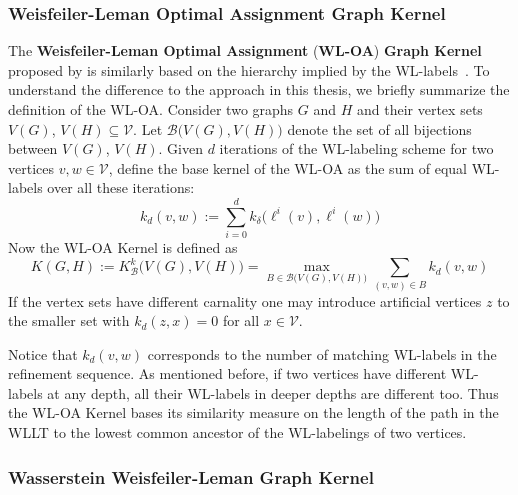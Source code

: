 	\subsubsection{Weisfeiler-Leman Optimal Assignment Graph Kernel} \label{subsec:def_WLOA}
		The \textbf{Weisfeiler-Leman Optimal Assignment} (\textbf{WL-OA}) \textbf{Graph Kernel} proposed by \citeauthor{2016_Kriege_NIPS} is similarly based on the hierarchy implied by the WL-labels~\cite{2016_Kriege_NIPS}.		
		To understand the difference to the approach in this thesis, we briefly summarize the definition of the WL-OA.
		Consider two graphs $G$ and $H$ and their vertex sets $V(G)$, $V(H) \subseteq\mathcal{V}$.
		Let $\mathcal{B}\big(V(G), V(H)\big)$ denote the set of all bijections between $V(G)$, $V(H)$.
		Given $d$ iterations of the WL-labeling scheme for two vertices $v,w\in\mathcal{V}$, define the base kernel of the WL-OA as the sum of equal WL-labels over all these iterations:
		\[ k_d(v,w) := \sum_{i=0}^{d} k_{\delta}\big( \ell^i(v), \ell^i(w) \big) \]
		Now the WL-OA Kernel is defined as
		\[ K(G, H) := K_{\mathcal{B}}^{k}\big( V(G), V(H) \big) = \max\limits_{B\in\mathcal{B}\big(V(G), V(H)\big)} \sum_{(v,w)\in B}k_d(v,w)  \]
		If the vertex sets have different carnality one may introduce artificial vertices $z$ to the smaller set with $k_d(z,x)=0$ for all $x\in\mathcal{V}$.
		
		Notice that $k_d(v,w)$ corresponds to the number of matching WL-labels in the refinement sequence.
		As mentioned before, if two vertices have different WL-labels at any depth, all their WL-labels in deeper depths are different too.
		Thus the WL-OA Kernel bases its similarity measure on the length of the path in the WLLT to the lowest common ancestor of the WL-labelings of two vertices.
						
	\subsubsection{Wasserstein Weisfeiler-Leman Graph Kernel} \label{subsec:def_WWLKernel}
		
